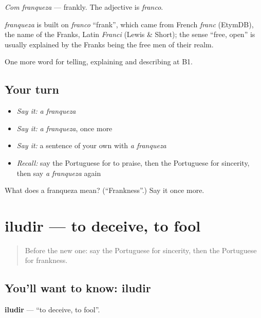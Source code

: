\emph{Com franqueza} — frankly. The adjective is \emph{franco}.

\begin{cousinweb}
\emph{franqueza} is built on \emph{franco} \textquotedblleft{}frank\textquotedblright{}, which came from French \emph{franc} (EtymDB), the name of the Franks, Latin \emph{Franci} (Lewis \& Short); the sense \textquotedblleft{}free, open\textquotedblright{} is usually explained by the Franks being the free men of their realm.
\end{cousinweb}

\begin{grammarlens}[title={What you've built}]
One more word for telling, explaining and describing at B1.
\end{grammarlens}

\subsection*{Your turn}
\begin{itemize}
\raggedright
  \item \emph{Say it:} \emph{a franqueza}
  \item \emph{Say it:} \emph{a franqueza}, once more
  \item \emph{Say it:} a sentence of your own with \emph{a franqueza}
  \item \emph{Recall:} say the Portuguese for to praise, then the Portuguese for sincerity, then say \emph{a franqueza} again
\end{itemize}

\begin{tcolorbox}[breakable,colback=teal!4,colframe=teal!35!black,title={Before you move on}]
What does a franqueza mean? (\textquotedblleft{}Frankness\textquotedblright{}.) Say it once more.
\end{tcolorbox}
\section[iludir]{iludir — to deceive, to fool}

\label{lesson:PT-C471-iludir}



\begin{quote}
Before the new one: say the Portuguese for sincerity, then the Portuguese for frankness.
\end{quote}

\subsection*{You'll want to know: iludir}
\textbf{iludir} — \textquotedblleft{}to deceive, to fool\textquotedblright{}.


